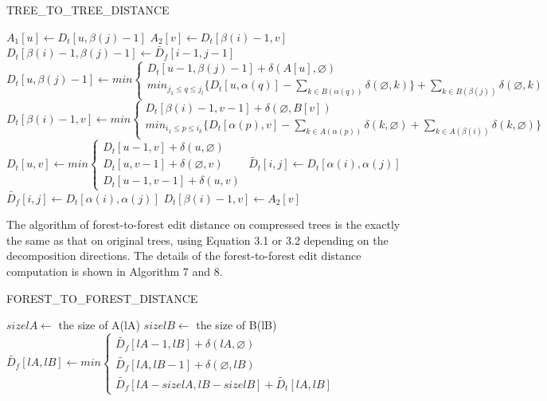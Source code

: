 \IncMargin{1em}
\begin{algorithm}
  \caption{TREE\_TO\_TREE\_DISTANCE}

   {
	$A_1[u] \gets D_t[u, \beta(j) - 1]$\;  
  }
   {
	$A_2[v] \gets D_t[\beta(i) - 1, v]$\;  
  }
  $D_t[\beta(i) - 1, \beta(j) - 1] \gets \widetilde{D_f}[i - 1, j - 1]$\;
   {
	$D_t[u, \beta(j) - 1] \gets min \begin{cases}
	D_t[u - 1, \beta(j) - 1] + \delta(A[u], \varnothing)\\
	min_{j_1 \leq q \leq j_l}\{D_t[u, \alpha(q)] - \sum_{k \in B(\alpha(q))}\delta(\varnothing, k)\} + \sum_{k \in B(\beta(j))}\delta(\varnothing, k)
	\end{cases}	
	$  
  }
   {
  	$D_t[\beta(i) - 1, v] \gets min \begin{cases}
  	D_t[\beta(i) - 1, v - 1] + \delta(\varnothing, B[v])\\
  	min_{i_1 \leq p \leq i_k}\{D_t[\alpha(p), v] - \sum_{k \in A(\alpha(p))}\delta(k, \varnothing)+ \sum_{k \in A(\beta(i))}\delta(k, \varnothing)\}
	\end{cases}  	
  	$
  }
   {
	 {
		$D_t[u, v] \gets min \begin{cases}
		D_t[u - 1, v] + \delta(u, \varnothing)\\
		D_t[u, v - 1] + \delta(\varnothing, v)\\
		D_t[u - 1, v - 1] + \delta(u, v)
		\end{cases}		
		$	
	} 
  }
  $\widetilde{D_t}[i, j] \gets D_t[\alpha(i), \alpha(j)]$\;
  $\widetilde{D_f}[i, j] \gets D_t[\alpha(i), \alpha(j)]$\;
   {
	$D_t[\beta(i) - 1, v] \gets A_2[v]$\;  
  }
\end{algorithm}

The algorithm of forest-to-forest edit distance on compressed trees is the exactly the same as that on original trees, using Equation 3.1 or 3.2 depending on the decomposition directions. The details of the forest-to-forest edit distance computation is shown in Algorithm 7 and 8.

\IncMargin{1em}
\begin{algorithm}
  \caption{FOREST\_TO\_FOREST\_DISTANCE}
  $sizelA \gets$ the size of A(lA)\;
  $sizelB \gets$ the size of B(lB)\;
  $\widetilde{D_f}[lA, lB] \gets min \begin{cases}
	\widetilde{D_f}[lA - 1, lB] + \delta(lA, \varnothing)\\
	\widetilde{D_f}[lA, lB - 1] + \delta(\varnothing, lB)\\
	\widetilde{D_f}[lA - sizelA, lB - sizelB] + \widetilde{D_t}[lA, lB]
  \end{cases}  
  $
\end{algorithm}

